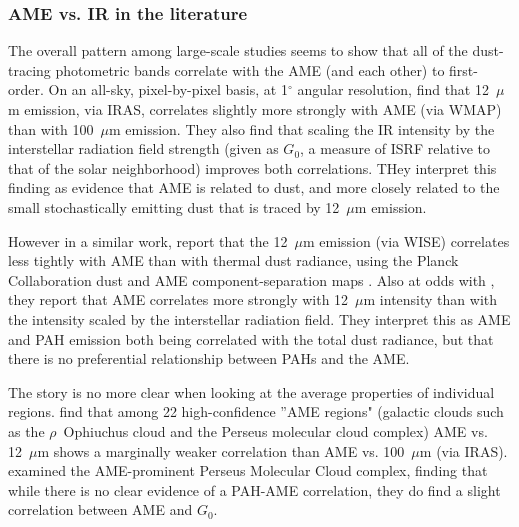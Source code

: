        \subsubsection{AME vs. IR in the literature}
        The overall pattern among large-scale studies seems to show that all of the dust-tracing photometric bands correlate with the AME (and each other) to first-order.  On an all-sky, pixel-by-pixel basis, at 1$^{\circ}$ angular resolution, \cite{ysard10b} find that 12~$\mu$m emission, via IRAS, correlates slightly more strongly with AME (via WMAP) than with 100~$\mu$m emission.  They also find that scaling the IR intensity by the interstellar radiation field strength (given as $G_0$, a measure of ISRF relative to that of the solar neighborhood) improves both correlations. THey interpret this finding as evidence that AME is related to dust, and more closely related to the small stochastically emitting dust that is traced by 12~$\mu$m emission.

        However in a similar work, \cite{hensley16} report that the 12~$\mu$m emission (via WISE) correlates less tightly with AME than with thermal dust radiance, using the Planck Collaboration dust and AME component-separation maps \citep{planck15X}. Also at odds with \cite{ysard10b}, they report that AME correlates more strongly with 12~$\mu$m intensity than with the intensity scaled by the interstellar radiation field. They interpret this as AME and PAH emission both being correlated with the total dust radiance, but that there is no preferential relationship between PAHs and the AME.

       The story is no more clear when looking at the average properties of individual regions. \cite{planckXV} find that among 22 high-confidence ''AME regions" (galactic clouds such as the $\rho$~Ophiuchus cloud and the Perseus molecular cloud complex) AME vs. 12~$\mu$m  shows a marginally weaker correlation than AME vs. 100~$\mu$m (via IRAS). \cite{tibbs11} examined the AME-prominent Perseus Molecular Cloud complex, finding that while there is no clear evidence of a PAH-AME correlation, they do find a slight correlation between AME and  $G_0$.



